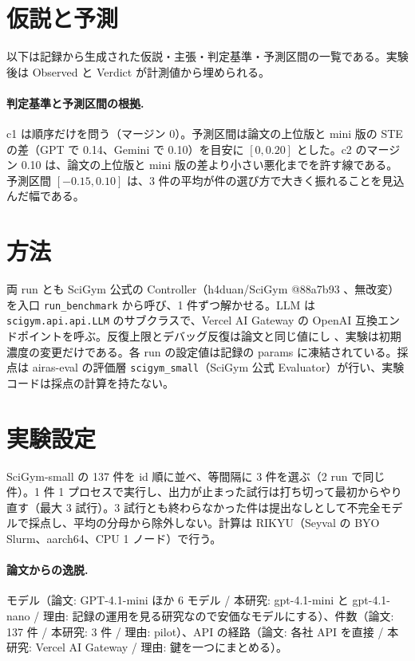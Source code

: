 \documentclass{article}
\providecommand{\unverified}[1]{#1}
\begin{document}
\section{仮説と予測}
\label{sec:hypothesis}
以下は記録から生成された仮説・主張・判定基準・予測区間の一覧である。実験後は Observed と Verdict が計測値から埋められる。



\paragraph{判定基準と予測区間の根拠.}
c1 は順序だけを問う（マージン 0）。予測区間は論文の上位版と mini 版の STE の差（GPT で \unverified{0.14}、Gemini で \unverified{0.10}）を目安に $[0, 0.20]$ とした。c2 のマージン 0.10 は、論文の上位版と mini 版の差より小さい悪化までを許す線である。予測区間 $[-0.15, 0.10]$ は、3 件の平均が件の選び方で大きく振れることを見込んだ幅である。

\section{方法}
\label{sec:method}
両 run とも SciGym 公式の Controller（h4duan/SciGym @88a7b93 \citep{h4duan-2025-scigym}、無改変）を入口 \texttt{run\_benchmark} \cite[s2.p1]{h4duan-2025-scigym} から呼び、1 件ずつ解かせる。LLM は \texttt{scigym.api.api.LLM} のサブクラスで、Vercel AI Gateway の OpenAI 互換エンドポイントを呼ぶ。反復上限とデバッグ反復は論文と同じ値にし \cite[s1.p1]{duan-2025-measuring}\cite[s1.p2]{duan-2025-measuring}、実験は初期濃度の変更だけである。各 run の設定値は記録の params に凍結されている。採点は airas-eval の評価層 \texttt{scigym\_small}（SciGym 公式 Evaluator）が行い、実験コードは採点の計算を持たない。

\section{実験設定}
\label{sec:setup}
SciGym-small の 137 件を id 順に並べ、等間隔に 3 件を選ぶ（2 run で同じ件）。1 件 1 プロセスで実行し、出力が止まった試行は打ち切って最初からやり直す（最大 3 試行）。3 試行とも終わらなかった件は提出なしとして不完全モデルで採点し、平均の分母から除外しない。計算は RIKYU（Seyval の BYO Slurm、aarch64、CPU 1 ノード）で行う。

\paragraph{論文からの逸脱.}
モデル（論文: GPT-4.1-mini ほか 6 モデル / 本研究: gpt-4.1-mini と gpt-4.1-nano / 理由: 記録の運用を見る研究なので安価なモデルにする）、件数（論文: 137 件 / 本研究: 3 件 / 理由: pilot）、API の経路（論文: 各社 API を直接 / 本研究: Vercel AI Gateway / 理由: 鍵を一つにまとめる）。
\end{document}
